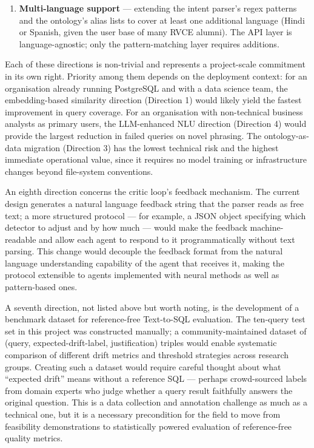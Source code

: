 \documentclass[12pt,a4paper]{report}
\begin{document}
\begin{enumerate}[leftmargin=2em,label=\arabic*.]
  \item \textbf{Multi-language support} — extending the intent parser's regex patterns and the ontology's alias lists to cover at least one additional language (Hindi or Spanish, given the user base of many RVCE alumni). The \ac{API} layer is language-agnostic; only the pattern-matching layer requires additions.
\end{enumerate}

Each of these directions is non-trivial and represents a project-scale commitment in its own right. Priority among them depends on the deployment context: for an organisation already running PostgreSQL and with a data science team, the embedding-based similarity direction (Direction 1) would likely yield the fastest improvement in query coverage. For an organisation with non-technical business analysts as primary users, the LLM-enhanced NLU direction (Direction 4) would provide the largest reduction in failed queries on novel phrasing. The ontology-as-data migration (Direction 3) has the lowest technical risk and the highest immediate operational value, since it requires no model training or infrastructure changes beyond file-system conventions.

An eighth direction concerns the critic loop's feedback mechanism. The current design generates a natural language feedback string that the parser reads as free text; a more structured protocol — for example, a JSON object specifying which detector to adjust and by how much — would make the feedback machine-readable and allow each agent to respond to it programmatically without text parsing. This change would decouple the feedback format from the natural language understanding capability of the agent that receives it, making the protocol extensible to agents implemented with neural methods as well as pattern-based ones.

A seventh direction, not listed above but worth noting, is the development of a benchmark dataset for reference-free Text-to-SQL evaluation. The ten-query test set in this project was constructed manually; a community-maintained dataset of (query, expected-drift-label, justification) triples would enable systematic comparison of different drift metrics and threshold strategies across research groups. Creating such a dataset would require careful thought about what ``expected drift'' means without a reference SQL — perhaps crowd-sourced labels from domain experts who judge whether a query result faithfully answers the original question. This is a data collection and annotation challenge as much as a technical one, but it is a necessary precondition for the field to move from feasibility demonstrations to statistically powered evaluation of reference-free quality metrics.
\end{document}
